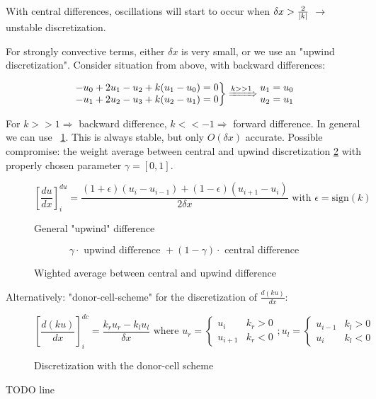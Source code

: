 With central differences, oscillations will start to occur when $\delta x > \frac{2}{\lvert k\rvert}$ $\rightarrow$ unstable discretization.

For strongly convective terms, either $\delta x$ is very small, or we use an "upwind discretization". Consider situation from above, with backward differences:

\[\left.\begin{matrix}
	-u_0 + 2u_1 -u_2  + k(u_1 -u_0) =0\\
	-u_1 + 2u_2 - u_3 + k(u_2-u_1) = 0
	\end{matrix}\right\rbrace \xRightarrow{k >> 1}\begin{matrix}
	u_1 = u_0\\
	u_2 = u_1
	\end{matrix} \]

For $k >> 1 \Rightarrow$ backward difference, $k << -1 \Rightarrow$ forward difference.
In general we can use ~\ref{fig:disc-upwind}. This is always stable, but only $O(\delta x)$ accurate. Possible compromise: the weight average between central and upwind discretization \ref{fig:weighted-average} with properly chosen parameter $\gamma = [0,1]$.
\begin{figure}[H]
	\centering
   \[ \left[\frac{d u}{d x}\right]^{du}_i = \frac{ (1+\epsilon) (u_i - u_{i-1}) + (1 - \epsilon) (u_{i+1} - u_i)}{ 2 \delta x} \text{ with } \epsilon = \text{sign}(k) \]
	\renewcommand{\thefigure}{3.9}
	\caption{General "upwind" difference}
	\label{fig:disc-upwind}
\end{figure}

\begin{figure}[H]
	\centering
	\[ \gamma \cdot \text{ upwind difference } + (1-\gamma) \cdot \text{ central difference} \]
	\renewcommand{\thefigure}{3.10}
	\caption{Wighted average between central and upwind difference}
	\label{fig:weighted-average}
\end{figure}

Alternatively: "donor-cell-scheme" for the discretization of $\frac{d(ku)}{dx}$:
\begin{figure}[h]
	\centering
	\[ \left[\frac{d(k u)}{d x}\right]^{dc}_i = \frac{ k_r u_r - k_l u_l}{ \delta x} \text{ where } u_r = \begin{cases}
	u_i & k_r > 0\\
	u_{i+1} & k_r < 0
\end{cases} ; u_l = \begin{cases}
u_{i-1} & k_l > 0\\
u_{i} & k_l < 0
\end{cases} \]
	\renewcommand{\thefigure}{3.11}
	\caption{Discretization with the donor-cell scheme}
	\label{fig:dcs-method}
\end{figure}
TODO line


